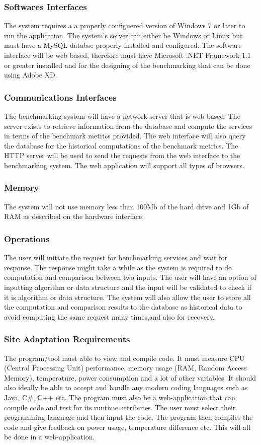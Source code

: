 \documentclass[a4paper,12pt]{article}
\begin{document}
\subsubsection{Softwares Interfaces}
The system requires a a properly configuered version of Windows 7 or later to run the application. The system's server can either be Windows or Linux but must have a MySQL databse properly installed and configured. The software interface will be web based, therefore must have Microsoft .NET Framework 1.1 or greater installed and for the designing of the benchmarking that can be done using Adobe XD.

\subsubsection{Communications Interfaces}
The benchmarking system will have a network server that is web-based. The server exists to retrieve information from the database
and compute the services in terms of the benchmark metrics provided. The web interface will also query the database for the historical computations of the benchmark metrics. The HTTP server will be used to send the requests from the web interface to
the benchmarking system. The web application will support all types of browsers.
\subsubsection{Memory}
The system will not use memory less than 100Mb of the hard drive and 1Gb of RAM as described on the hardware interface.
\subsubsection{Operations}
The user will initiate the request for benchmarking services and wait for response. The response might take a while as the system is required to do computation and comparison between two inputs. The user will have an option of inputting algorithm or data structure and the input will be validated to check if it is algorithm or data structure. The system will also allow the user to store all the computation and comparison results to the database as historical data to avoid computing the same request many times,and also for recovery. 
\subsubsection{Site Adaptation Requirements}
The program/tool must able to view and compile code. It must measure CPU (Central Processing Unit) performance, memory usage (RAM, Random Access Memory), temperature, power consumption and a lot of other variables.
It should also ideally be able to accept and handle any modern coding languages such as Java, C\#, C++ etc. The program must also be a web-application that can compile code and test for its runtime attributes. 
The user must select their programming language and then input the code. The program then compiles the code and give feedback on power usage, temperature difference etc. This will all be done in a web-application.
\end{document}
